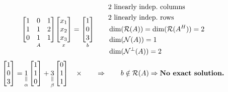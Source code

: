 \begin{example}
\[
\underset{A}{\begin{bmatrix}1&0&1\\1&1&2\\0&1&1\end{bmatrix}}\underset{x}{\begin{bmatrix}x_1\\x_2\\x_3\end{bmatrix}}=\underset{b}{\begin{bmatrix}1\\0\\3\end{bmatrix}}
\qquad
\begin{aligned}
&2\text{ linearly indep.\ columns}\\
&2\text{ linearly indep.\ rows}\\
&\dim(\mathcal{R}(A))=\dim(\mathcal{R}(A^{H}))=2\\
&\dim(\mathcal{N}(A))=1\\
&\dim(\mathcal{N}^\perp(A))=2
\end{aligned}
\]
\[
\begin{bmatrix}1\\0\\3\end{bmatrix}=\underset{\alpha}{\underset{\parallel}{1}}\begin{bmatrix}1\\1\\0\end{bmatrix}+\underset{\beta}{\underset{\parallel}{3}}\begin{bmatrix}0\\1\\1\end{bmatrix}\quad\times
\qquad\Rightarrow\qquad b\notin\mathcal{R}(A)\Rightarrow\text{\textbf{No exact solution.}}
\]


\end{example}
